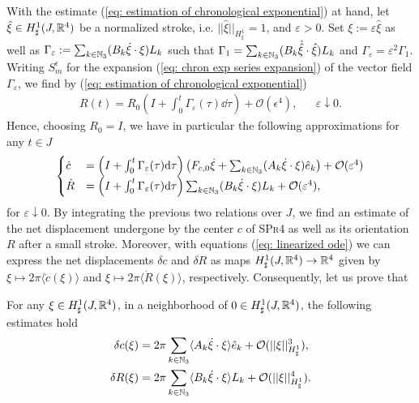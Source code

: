 With the estimate (\ref{eq: estimation of chronological exponential}) at hand, let $\hat{\xi} \in H^1_{\sharp}(J, \mathbb{R}^4)$ be a normalized stroke, i.e. $||\hat{\xi}||_{H_{\sharp}^1} = 1$, and $\varepsilon > 0$. Set $\xi := \varepsilon \hat{\xi}$ as well as $\Gamma_\varepsilon := \sum_{k \in \mathbb{N}_3}(B_k \dot{\xi} \cdot \xi) L_k$ such that $\Gamma_1 = \sum_{k \in \mathbb{N}_3}(B_k \dot{\hat{\xi}} \cdot \hat{\xi}) L_k$ and  $\Gamma_\varepsilon = \varepsilon^2 \Gamma_1$. Writing $S_{m}^{\epsilon}$ for the expansion (\ref{eq: chron exp series expansion}) of the vector field $\Gamma_\varepsilon$, we find by (\ref{eq: estimation of chronological exponential})
\begin{align}
	R(t) = R_0 \left ( I + \int_{0}^{t} \Gamma_\varepsilon(\tau) \dd\tau \right ) + \mathcal{O}(\epsilon^4), & & \varepsilon \downarrow 0.
\end{align}
Hence, choosing $R_0 = I$, we have in particular the following approximations for any $t \in J $
\begin{align}
\label{eq: linearized ode}
\begin{cases}
\dot{c} &= \left ( I + \int_{0}^{t} \Gamma_\varepsilon(\tau) \mathrm{d}\tau \right ) \left ( F_{c,0} \dot{\xi} + \sum_{k \in \mathbb{N}_3} (A_k \dot{\xi} \cdot \xi) \hat{e}_k \right )  + \mathcal{O}(\varepsilon^4)\\
\dot{R} &= \left ( I + \int_{0}^{t} \Gamma_\varepsilon(\tau) \mathrm{d}\tau \right ) \sum_{k \in \mathbb{N}_3}(B_k \dot{\xi} \cdot \xi) L_k + \mathcal{O}(\varepsilon^4),
\end{cases}
\end{align}
for $\varepsilon\downarrow 0$. By integrating the previous two relations over $J$, we find an estimate of the net displacement undergone by the center $c$ of \textsc{SPr4} as well as its orientation $R$ after a small stroke. Moreover, with equations (\ref{eq: linearized ode}) we can express the net displacements $\delta c$ and $\delta R$ as maps $H_{\sharp}^1(J,\mathbb{R}^4) \to \mathbb{R}^4$ given by $\xi \mapsto 2 \pi \langle \dot{c}(\xi) \rangle $ and $\xi \mapsto 2 \pi \langle \dot{R}(\xi) \rangle$, respectively. Consequently, let us prove that

\begin{proposition}
\label{prop:net displacement}
For any $\xi \in H_\sharp^1(J, \mathbb{R}^4)$, in a neighborhood of $0 \in H_{\sharp}^{1}(J, \mathbb{R}^4)$, the following estimates hold
\begin{equation}
\begin{aligned}
\delta c(\xi) &= 2 \pi \sum_{k \in \mathbb{N}_3} \langle A_k \dot{\xi} \cdot \xi \rangle \hat{e}_k + \mathcal{O}(||\xi||_{H^1_{\sharp}}^3),\\
\delta R(\xi) &= 2 \pi \sum_{k \in \mathbb{N}_3} \langle B_k \dot{\xi} \cdot \xi \rangle L_k + \mathcal{O}(||\xi||^4_{H_\sharp^1}).
\end{aligned}
\end{equation}
\end{proposition}

